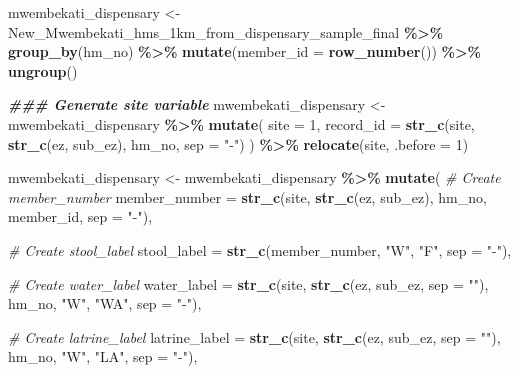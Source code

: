 \documentclass[
]{article}
\newenvironment{Shaded}{\begin{snugshade}}{\end{snugshade}}
\newcommand{\AttributeTok}[1]{\textcolor[rgb]{0.13,0.29,0.53}{#1}}
\newcommand{\CommentTok}[1]{\textcolor[rgb]{0.56,0.35,0.01}{\textit{#1}}}
\newcommand{\DecValTok}[1]{\textcolor[rgb]{0.00,0.00,0.81}{#1}}
\newcommand{\DocumentationTok}[1]{\textcolor[rgb]{0.56,0.35,0.01}{\textbf{\textit{#1}}}}
\newcommand{\FunctionTok}[1]{\textcolor[rgb]{0.13,0.29,0.53}{\textbf{#1}}}
\newcommand{\NormalTok}[1]{#1}
\newcommand{\OtherTok}[1]{\textcolor[rgb]{0.56,0.35,0.01}{#1}}
\newcommand{\SpecialCharTok}[1]{\textcolor[rgb]{0.81,0.36,0.00}{\textbf{#1}}}
\newcommand{\StringTok}[1]{\textcolor[rgb]{0.31,0.60,0.02}{#1}}
\begin{document}
\begin{Shaded}
\begin{Highlighting}[]
\NormalTok{mwembekati\_dispensary }\OtherTok{\textless{}{-}}\NormalTok{ New\_Mwembekati\_hms\_1km\_from\_dispensary\_sample\_final }\SpecialCharTok{\%\textgreater{}\%}
  \FunctionTok{group\_by}\NormalTok{(hm\_no) }\SpecialCharTok{\%\textgreater{}\%}
  \FunctionTok{mutate}\NormalTok{(}\AttributeTok{member\_id =} \FunctionTok{row\_number}\NormalTok{()) }\SpecialCharTok{\%\textgreater{}\%}
  \FunctionTok{ungroup}\NormalTok{()}

\DocumentationTok{\#\#\# Generate site variable }
\NormalTok{mwembekati\_dispensary }\OtherTok{\textless{}{-}}\NormalTok{ mwembekati\_dispensary }\SpecialCharTok{\%\textgreater{}\%}
  \FunctionTok{mutate}\NormalTok{(}
    \AttributeTok{site =} \DecValTok{1}\NormalTok{,}
    \AttributeTok{record\_id =} \FunctionTok{str\_c}\NormalTok{(site, }\FunctionTok{str\_c}\NormalTok{(ez, sub\_ez), hm\_no, }\AttributeTok{sep =} \StringTok{"{-}"}\NormalTok{)}
\NormalTok{  ) }\SpecialCharTok{\%\textgreater{}\%}
  \FunctionTok{relocate}\NormalTok{(site, }\AttributeTok{.before =} \DecValTok{1}\NormalTok{)}

\NormalTok{mwembekati\_dispensary }\OtherTok{\textless{}{-}}\NormalTok{ mwembekati\_dispensary }\SpecialCharTok{\%\textgreater{}\%}
  \FunctionTok{mutate}\NormalTok{(}
    \CommentTok{\# Create member\_number}
    \AttributeTok{member\_number =} \FunctionTok{str\_c}\NormalTok{(site, }\FunctionTok{str\_c}\NormalTok{(ez, sub\_ez), hm\_no, member\_id, }\AttributeTok{sep =} \StringTok{"{-}"}\NormalTok{),}
    
    \CommentTok{\# Create stool\_label}
    \AttributeTok{stool\_label =} \FunctionTok{str\_c}\NormalTok{(member\_number, }\StringTok{"W"}\NormalTok{, }\StringTok{"F"}\NormalTok{, }\AttributeTok{sep =} \StringTok{"{-}"}\NormalTok{),}
    
    \CommentTok{\# Create water\_label}
    \AttributeTok{water\_label =} \FunctionTok{str\_c}\NormalTok{(site, }\FunctionTok{str\_c}\NormalTok{(ez, sub\_ez, }\AttributeTok{sep =} \StringTok{""}\NormalTok{), hm\_no, }\StringTok{"W"}\NormalTok{, }\StringTok{"WA"}\NormalTok{, }\AttributeTok{sep =} \StringTok{"{-}"}\NormalTok{),}
    
    \CommentTok{\# Create latrine\_label}
    \AttributeTok{latrine\_label =} \FunctionTok{str\_c}\NormalTok{(site, }\FunctionTok{str\_c}\NormalTok{(ez, sub\_ez, }\AttributeTok{sep =} \StringTok{""}\NormalTok{), hm\_no, }\StringTok{"W"}\NormalTok{, }\StringTok{"LA"}\NormalTok{, }\AttributeTok{sep =} \StringTok{"{-}"}\NormalTok{),}
    

\end{Highlighting}
\end{Shaded}
\end{document}
